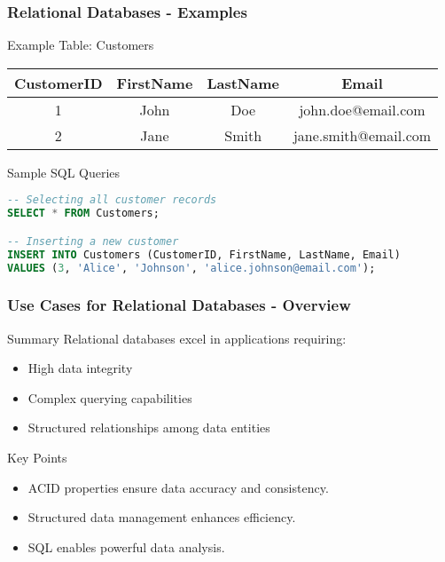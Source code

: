 \documentclass[aspectratio=169]{beamer}
\begin{document}
\begin{frame}[fragile]
    \frametitle{Relational Databases - Examples}
    \begin{block}{Example Table: Customers}
    \begin{tabular}{|c|c|c|c|}
        \hline
        CustomerID & FirstName & LastName & Email \\
        \hline
        1 & John & Doe & john.doe@email.com \\
        2 & Jane & Smith & jane.smith@email.com \\
        \hline
    \end{tabular}
    \end{block}

    \begin{block}{Sample SQL Queries}
    \begin{lstlisting}[language=SQL]
-- Selecting all customer records
SELECT * FROM Customers;

-- Inserting a new customer
INSERT INTO Customers (CustomerID, FirstName, LastName, Email)
VALUES (3, 'Alice', 'Johnson', 'alice.johnson@email.com');
    \end{lstlisting}
    \end{block}
\end{frame}

\begin{frame}[fragile]
    \frametitle{Use Cases for Relational Databases - Overview}
    \begin{block}{Summary}
        Relational databases excel in applications requiring:
        \begin{itemize}
            \item High data integrity
            \item Complex querying capabilities
            \item Structured relationships among data entities
        \end{itemize}
    \end{block}
    \begin{block}{Key Points}
        \begin{itemize}
            \item ACID properties ensure data accuracy and consistency.
            \item Structured data management enhances efficiency.
            \item SQL enables powerful data analysis.
        \end{itemize}
    \end{block}
\end{frame}
\end{document}
